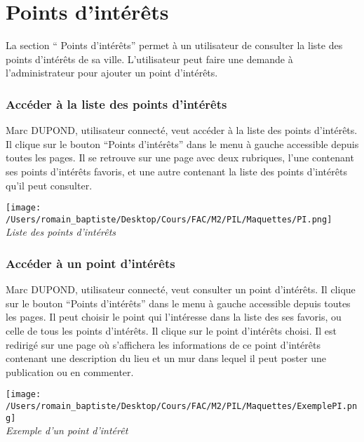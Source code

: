 \section*{Points d'intérêts}
La section “ Points d’intérêts” permet à un utilisateur de consulter la liste des points d’intérêts de sa ville. L’utilisateur peut faire une demande à l’administrateur pour ajouter un point d’intérêts.
\subsubsection*{Accéder à la liste des points d’intérêts}
Marc DUPOND, utilisateur connecté, veut accéder à la liste des points d’intérêts. Il clique sur le bouton “Points d’intérêts” dans le menu à gauche accessible depuis toutes les pages.  Il se retrouve sur une page avec deux rubriques, l’une contenant ses points d’intérêts favoris, et une autre contenant la liste des points d’intérêts qu’il peut consulter.
\begin{center}
\texttt{[image: /Users/romain\_baptiste/Desktop/Cours/FAC/M2/PIL/Maquettes/PI.png]}
\\
\emph{Liste des points d'intérêts}
\end{center}
\subsubsection*{Accéder à un point d’intérêts}
Marc DUPOND, utilisateur connecté, veut consulter un point d’intérêts. Il clique sur le bouton “Points d’intérêts” dans le menu à gauche accessible depuis toutes les pages.  Il peut choisir le point qui l’intéresse dans la liste des ses favoris, ou celle de tous les points d’intérêts. Il clique sur le point d’intérêts choisi. Il est redirigé sur une page où s’affichera les informations de ce point d’intérêts contenant une description du lieu et un mur dans lequel il peut poster une publication ou en commenter.
\begin{center}
\texttt{[image: /Users/romain\_baptiste/Desktop/Cours/FAC/M2/PIL/Maquettes/ExemplePI.png]}
\\
\emph{Exemple d'un point d'intérêt}
\end{center}
